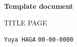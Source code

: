 \begin{titlepage}
  \begin{center}
    \vspace*{1cm}

    \Huge
    \textbf{Template document}

    \vspace{0.5cm}
    \LARGE

    TITLE PAGE

    \vspace{1.5cm}

    \texttt{Yuya HAGA}
    \texttt{00-00-0000}

    \vspace{0.8cm}

    \vfill

    \Large

  \end{center}
\end{titlepage}
